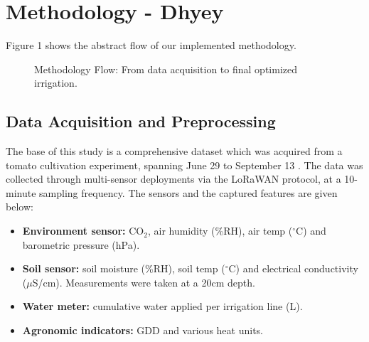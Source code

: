 \documentclass[conference]{IEEEtran}
\begin{document}
\section{Methodology - Dhyey}
Figure 1 shows the abstract flow of our implemented methodology.
\begin{figure}[t]
\centering
{}
\caption{Methodology Flow: From data acquisition to final optimized irrigation.}
\label{fig:methodology_flow}
\end{figure}
\subsection{Data Acquisition and Preprocessing}
The base of this study is a comprehensive dataset which was acquired from a tomato cultivation experiment, spanning June 29 to September 13 \cite{data}. The data was collected through multi-sensor deployments via the LoRaWAN protocol, at a 10-minute sampling frequency. The sensors and the captured features are given below:
\begin{itemize}
    \item \textbf{Environment sensor:} CO$_2$, air humidity (\%RH), air temp ($^\circ$C) and barometric pressure (hPa).
    \item \textbf{Soil sensor:} soil moisture (\%RH), soil temp ($^\circ$C) and electrical conductivity ($\mu$S/cm). Measurements were taken at a 20cm depth.
    \item \textbf{Water meter:} cumulative water applied per irrigation line (L).
    \item \textbf{Agronomic indicators:} GDD and various heat units.
\end{itemize}
\end{document}

